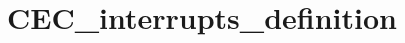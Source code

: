 \hypertarget{group___c_e_c__interrupts__definition}{\section{C\-E\-C\-\_\-interrupts\-\_\-definition}
\label{group___c_e_c__interrupts__definition}
}
